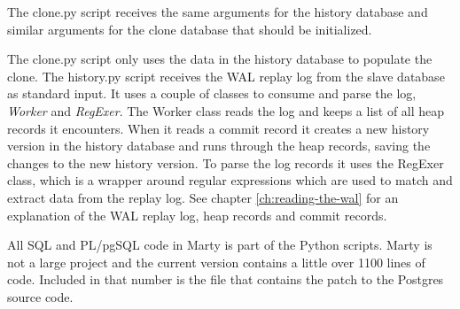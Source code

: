 The clone.py script receives the same arguments for the history database and similar arguments for the clone database that should be initialized.

The clone.py script only uses the data in the history database to populate the clone.
The history.py script receives the WAL replay log from the slave database as standard input.
It uses a couple of classes to consume and parse the log, \textit{Worker} and \textit{RegExer}.
The Worker class reads the log and keeps a list of all heap records it encounters.
When it reads a commit record it creates a new history version in the history database and runs through the heap records, saving the changes to the new history version.
To parse the log records it uses the RegExer class, which is a wrapper around regular expressions which are used to match and extract data from the replay log.
See chapter \ref{ch:reading-the-wal} for an explanation of the WAL replay log, heap records and commit records.

All SQL and PL/pgSQL code in Marty is part of the Python scripts.
Marty is not a large project and the current version contains a little over 1100 lines of code.
Included in that number is the file that contains the patch to the Postgres source code.


